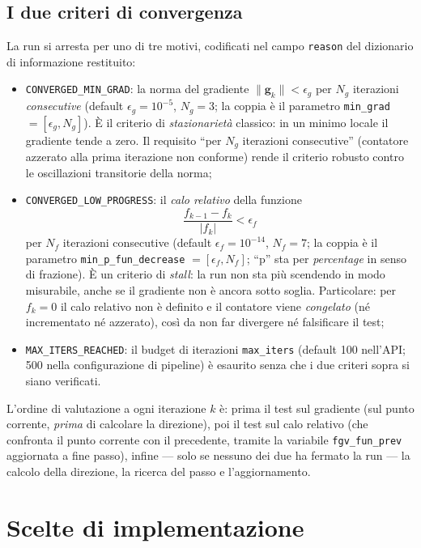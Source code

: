 \subsection{I due criteri di convergenza}

La run si arresta per uno di tre motivi, codificati nel campo
\texttt{reason} del dizionario di informazione restituito:

\begin{itemize}
\item \texttt{CONVERGED\_MIN\_GRAD}: la norma del gradiente
  $\|\bm{g}_k\| < \epsilon_g$ per $N_g$ iterazioni \emph{consecutive}
  (default $\epsilon_g = 10^{-5}$, $N_g = 3$; la coppia è il parametro
  \texttt{min\_grad} $= [\epsilon_g, N_g]$). È il criterio di
  \emph{stazionarietà} classico: in un minimo locale il gradiente tende a
  zero. Il requisito ``per $N_g$ iterazioni consecutive'' (contatore
  azzerato alla prima iterazione non conforme) rende il criterio robusto
  contro le oscillazioni transitorie della norma;
\item \texttt{CONVERGED\_LOW\_PROGRESS}: il \emph{calo relativo} della
  funzione
  \[
  \frac{f_{k-1} - f_k}{|f_k|} < \epsilon_f
  \]
  per $N_f$ iterazioni consecutive (default
  $\epsilon_f = 10^{-14}$, $N_f = 7$; la coppia è il parametro
  \texttt{min\_p\_fun\_decrease} $= [\epsilon_f, N_f]$; ``p'' sta per
  \emph{percentage} in senso di frazione). È un criterio di
  \emph{stall}: la run non sta più scendendo in modo misurabile, anche se
  il gradiente non è ancora sotto soglia. Particolare: per $f_k = 0$ il
  calo relativo non è definito e il contatore viene \emph{congelato}
  (né incrementato né azzerato), così da non far divergere né
  falsificare il test;
\item \texttt{MAX\_ITERS\_REACHED}: il budget di iterazioni
  \texttt{max\_iters} (default 100 nell'API; 500 nella configurazione di
  pipeline) è esaurito senza che i due criteri sopra si siano verificati.
\end{itemize}

L'ordine di valutazione a ogni iterazione $k$ è: prima il test sul
gradiente (sul punto corrente, \emph{prima} di calcolare la direzione),
poi il test sul calo relativo (che confronta il punto corrente con il
precedente, tramite la variabile \texttt{fgv\_fun\_prev} aggiornata a
fine passo), infine — solo se nessuno dei due ha fermato la run — la
calcolo della direzione, la ricerca del passo e l'aggiornamento.

\section{Scelte di implementazione}
\label{sec:lbfgs-impl}

